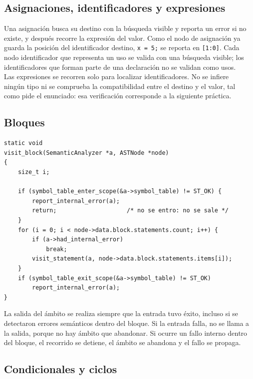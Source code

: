 \documentclass[12pt,letterpaper]{article}
\begin{document}
\subsection*{Asignaciones, identificadores y expresiones}

Una asignación busca su destino con la búsqueda visible y reporta un error si no existe, y después recorre
la expresión del valor. Como el nodo de asignación ya guarda la posición del identificador destino,
\texttt{x = 5;} se reporta en \texttt{[1:0]}. Cada nodo identificador que representa un uso se valida con
una búsqueda visible; los identificadores que forman parte de una declaración no se validan como usos.\\

Las expresiones se recorren solo para localizar identificadores. No se infiere ningún tipo ni se comprueba la
compatibilidad entre el destino y el valor, tal como pide el enunciado: esa verificación corresponde a la
siguiente práctica.

\subsection*{Bloques}

\begin{lstlisting}[style=modernc, caption={\texttt{visit\_block}.}]
static void
visit_block(SemanticAnalyzer *a, ASTNode *node)
{
    size_t i;

    if (symbol_table_enter_scope(&a->symbol_table) != ST_OK) {
        report_internal_error(a);
        return;                    /* no se entro: no se sale */
    }
    for (i = 0; i < node->data.block.statements.count; i++) {
        if (a->had_internal_error)
            break;
        visit_statement(a, node->data.block.statements.items[i]);
    }
    if (symbol_table_exit_scope(&a->symbol_table) != ST_OK)
        report_internal_error(a);
}
\end{lstlisting}

\bigskip

La salida del ámbito se realiza siempre que la entrada tuvo éxito, incluso si se detectaron errores
semánticos dentro del bloque. Si la entrada falla, no se llama a la salida, porque no hay ámbito que
abandonar. Si ocurre un fallo interno dentro del bloque, el recorrido se detiene, el ámbito se abandona y el
fallo se propaga.

\subsection*{Condicionales y ciclos}
\end{document}
